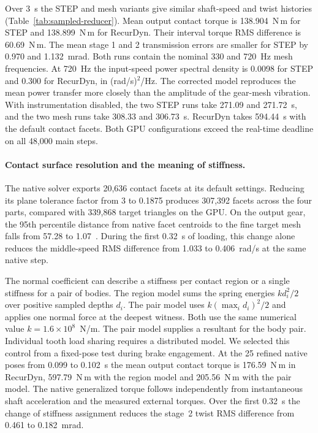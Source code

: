 Over 3~s the STEP and mesh variants give similar shaft-speed and twist histories (Table~\ref{tab:sampled-reducer}). Mean output contact torque is 138.904~N\,m for STEP and 138.899~N\,m for RecurDyn. Their interval torque RMS difference is 60.69~N\,m. The mean stage 1 and 2 transmission errors are smaller for STEP by 0.970 and 1.132~mrad. Both runs contain the nominal 330 and 720~Hz mesh frequencies. At 720~Hz the input-speed power spectral density is 0.0098 for STEP and 0.300 for RecurDyn, in (rad/s)$^2$/Hz. The corrected model reproduces the mean power transfer more closely than the amplitude of the gear-mesh vibration. With instrumentation disabled, the two STEP runs take 271.09 and 271.72~s, and the two mesh runs take 308.33 and 306.73~s. RecurDyn takes 594.44~s with the default contact facets. Both GPU configurations exceed the real-time deadline on all 48,000 main steps.

\paragraph{Contact surface resolution and the meaning of stiffness.}
The native solver exports 20,636 contact facets at its default settings. Reducing its plane tolerance factor from 3 to 0.1875 produces 307,392 facets across the four parts, compared with 339,868 target triangles on the GPU. On the output gear, the 95th percentile distance from native facet centroids to the fine target mesh falls from 57.28 to 1.07~\micron{}. During the first 0.32~s of loading, this change alone reduces the middle-speed RMS difference from 1.033 to 0.406~rad/s at the same native step.

The normal coefficient can describe a stiffness per contact region or a single stiffness for a pair of bodies. The region model sums the spring energies $k d_i^2/2$ over positive sampled depths $d_i$. The pair model uses $k(\max_i d_i)^2/2$ and applies one normal force at the deepest witness. Both use the same numerical value $k=1.6\times10^8$~N/m. The pair model supplies a resultant for the body pair. Individual tooth load sharing requires a distributed model. We selected this control from a fixed-pose test during brake engagement. At the 25 refined native poses from 0.099 to 0.102~s the mean output contact torque is 176.59~N\,m in RecurDyn, 597.79~N\,m with the region model and 205.56~N\,m with the pair model. The native generalized torque follows independently from instantaneous shaft acceleration and the measured external torques. Over the first 0.32~s the change of stiffness assignment reduces the stage~2 twist RMS difference from 0.461 to 0.182~mrad.

